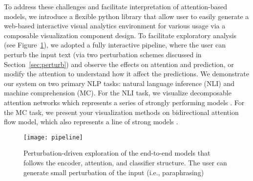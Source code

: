 To address these challenges and facilitate interpretation of attention-based models, 
we introduce a flexible python library that allow user to easily generate a web-based interactive visual analytics environment for various usage via a composable visualization component design.
%
To facilitate exploratory analysis (see Figure~\ref{fig:modelPipeline}), we adopted a fully interactive pipeline, where the user can perturb the input text (via two perturbation schemes discussed in Section~\ref{sec:perturb}) and observe the effects on attention and prediction, or modify the attention to understand how it affect the predictions.
%
We demonstrate our system on two primary NLP tasks: natural language
inference (NLI) and machine comprehension (MC). For the NLI task, we visualize
decomposable attention networks which represents a series of strongly performing models \cite{Parikh2016}.
For the MC task, we present your visualization methods on bidirectional attention flow model,
which also represents a line of strong models \cite{Seo2016}.

\begin{figure}[htbp]
\centering
\vspace{-2mm}
 \texttt{[image: pipeline]}
 \caption{
 Perturbation-driven exploration of the end-to-end models that follows the encoder, attention, and classifier structure. The user can generate small perturbation of the input (i.e., paraphrasing)
 }
\label{fig:modelPipeline}
\end{figure}



